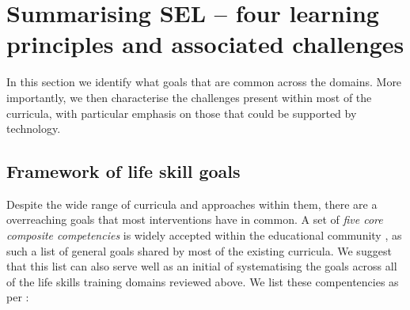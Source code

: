 \documentclass[prodmode,acmtochi]{acmsmall}
\begin{document}




\section{Summarising SEL -- four learning principles and associated challenges}
\label{sec:summary} 

\iffalse
In this section we identify what goals that are common across the domains. More importantly, we then characterise the challenges present within most of the curricula, with particular emphasis on those that could be supported by technology.

\subsection{Framework of life skill goals}

Despite the wide range of curricula and approaches within them, there are a overreaching goals that most interventions have in common. A set of \emph{five core composite competencies} is widely accepted within the educational community \cite{Zins2007,Durlak2011,CASEL2003,CASEL2013}, as such a list of general goals shared by most of the existing curricula. We suggest that this list can also serve well as an initial  of systematising the goals across all of the life skills training domains reviewed above. 
%
We list these compentencies as per :
\end{document}
